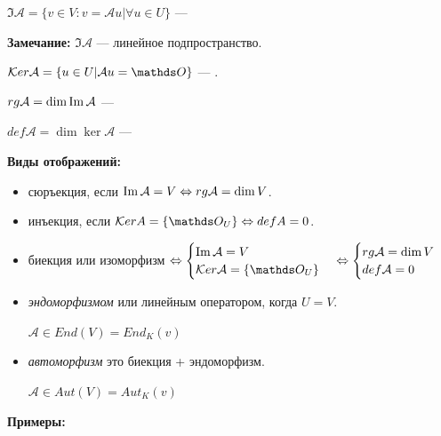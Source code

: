  $\Im \mathcal{A} = \{v \in V:v =\mathcal{A} u| \forall u\in U \}$ --- 

\textbf{Замечание:} $\Im \mathcal{A}$ --- линейное подпространство.

$\ker  \mathcal{A} = \{u \in U| \mathcal{A} u = \zero\}$ %
--- .

 $rg \mathcal{A} = \dim \operatorname{Im} \mathcal{A}$ ---  

 $def \mathcal{A} = \dim \ker \mathcal{A}$ --- 

\newpage

\textbf{Виды отображений:}

\begin{itemize}
    \item сюръекция, если $\operatorname{Im} \mathcal{A} = V \Leftrightarrow rg \mathcal{A}= \dim V$.
    \item инъекция, если $\ker A = \{\zero_U\} \Leftrightarrow def A = 0$.

    \item биекция или изоморфизм $\Leftrightarrow \begin{cases}
        \Im \mathcal{A} = V\\
        \ker \mathcal{A} = \{\zero_U\}
    \end{cases} \Leftrightarrow \begin{cases}
        \rg \mathcal{A} = \dim V \\
        def \mathcal{A} = 0
    \end{cases}$
    \item \emph{эндоморфизмом} или линейным оператором, когда $U = V$.

    $\mathcal{A} \in End(V) = End_K(v)$ %
    \item \emph{автоморфизм} это биекция + эндоморфизм.
    
     $\mathcal{A} \in Aut(V) = Aut_K(v)$ %
\end{itemize}

\textbf{Примеры:}

